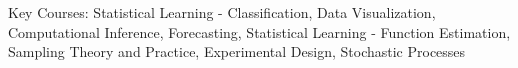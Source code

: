 \documentclass[letterpaper,11pt]{article}
\begin{document}
\begin{itemize}
	{\footnotesize Key Courses: Statistical Learning - Classification, 
	Data Visualization,
	Computational Inference, 
	Forecasting, 
	Statistical Learning - Function Estimation, 
	Sampling Theory and Practice, 
	Experimental Design, 
	Stochastic Processes
	\par}
\end{itemize}
\end{document}
